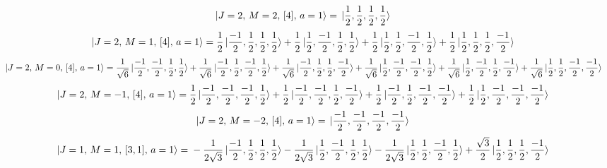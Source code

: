 \documentclass{article}
\begin{document}
\begin{equation*}
\begin{aligned}
\ket{J=2,\,M=2,\,[4],\,a=1} = \; &\ket{\frac{1}{2},\frac{1}{2},\frac{1}{2},\frac{1}{2}}
\end{aligned}
\end{equation*}
\begin{equation*}
\begin{aligned}
\ket{J=2,\,M=1,\,[4],\,a=1} = \; &\frac{1}{2} \ket{\frac{-1}{2},\frac{1}{2},\frac{1}{2},\frac{1}{2}} + \frac{1}{2} \ket{\frac{1}{2},\frac{-1}{2},\frac{1}{2},\frac{1}{2}} + \frac{1}{2} \ket{\frac{1}{2},\frac{1}{2},\frac{-1}{2},\frac{1}{2}} + \frac{1}{2} \ket{\frac{1}{2},\frac{1}{2},\frac{1}{2},\frac{-1}{2}}
\end{aligned}
\end{equation*}
\begin{equation*}
\begin{aligned}
\ket{J=2,\,M=0,\,[4],\,a=1} = \; &\frac{1}{\sqrt{6}} \ket{\frac{-1}{2},\frac{-1}{2},\frac{1}{2},\frac{1}{2}} + \frac{1}{\sqrt{6}} \ket{\frac{-1}{2},\frac{1}{2},\frac{-1}{2},\frac{1}{2}} + \frac{1}{\sqrt{6}} \ket{\frac{-1}{2},\frac{1}{2},\frac{1}{2},\frac{-1}{2}} + \frac{1}{\sqrt{6}} \ket{\frac{1}{2},\frac{-1}{2},\frac{-1}{2},\frac{1}{2}} + \frac{1}{\sqrt{6}} \ket{\frac{1}{2},\frac{-1}{2},\frac{1}{2},\frac{-1}{2}} + \frac{1}{\sqrt{6}} \ket{\frac{1}{2},\frac{1}{2},\frac{-1}{2},\frac{-1}{2}}
\end{aligned}
\end{equation*}
\begin{equation*}
\begin{aligned}
\ket{J=2,\,M=-1,\,[4],\,a=1} = \; &\frac{1}{2} \ket{\frac{-1}{2},\frac{-1}{2},\frac{-1}{2},\frac{1}{2}} + \frac{1}{2} \ket{\frac{-1}{2},\frac{-1}{2},\frac{1}{2},\frac{-1}{2}} + \frac{1}{2} \ket{\frac{-1}{2},\frac{1}{2},\frac{-1}{2},\frac{-1}{2}} + \frac{1}{2} \ket{\frac{1}{2},\frac{-1}{2},\frac{-1}{2},\frac{-1}{2}}
\end{aligned}
\end{equation*}
\begin{equation*}
\begin{aligned}
\ket{J=2,\,M=-2,\,[4],\,a=1} = \; &\ket{\frac{-1}{2},\frac{-1}{2},\frac{-1}{2},\frac{-1}{2}}
\end{aligned}
\end{equation*}
\begin{equation*}
\begin{aligned}
\ket{J=1,\,M=1,\,[3,1],\,a=1} = \; &- \frac{1}{2\sqrt{3}} \ket{\frac{-1}{2},\frac{1}{2},\frac{1}{2},\frac{1}{2}} - \frac{1}{2\sqrt{3}} \ket{\frac{1}{2},\frac{-1}{2},\frac{1}{2},\frac{1}{2}} - \frac{1}{2\sqrt{3}} \ket{\frac{1}{2},\frac{1}{2},\frac{-1}{2},\frac{1}{2}} + \frac{\sqrt{3}}{2} \ket{\frac{1}{2},\frac{1}{2},\frac{1}{2},\frac{-1}{2}}
\end{aligned}
\end{equation*}
\end{document}
